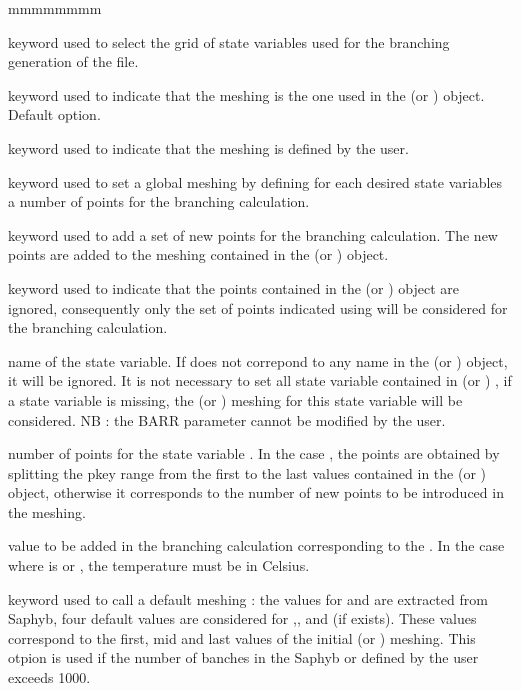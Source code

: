 \begin{ListeDeDescription}{mmmmmmmm}
\item[\moc{GRID}] keyword used to select the grid of state variables used for the branching generation of the  file.

\item[\moc{SAP}] keyword used to indicate that the meshing is the one used in the  (or )   object. Default option.

\item[\moc{USER}] keyword used to indicate that the meshing is defined by the user.

\item[\moc{GLOBAL}] keyword used to set a global meshing by defining for each desired  state variables a number of points for the branching calculation.

\item[\moc{ADD}] keyword used to add a set of new points for the branching calculation. The new points are added to the meshing contained in the  (or )   object.

\item[\moc{NEW}] keyword used to indicate that the points contained in the  (or )   object are ignored, consequently only the set of points indicated using  will be considered for the branching calculation.

\item[\dusa{pkey}] name of the state variable. If  does not correpond to any name in the  (or )   object, it will be ignored.  It is not necessary to set all state variable contained in  (or )  , if a state variable is missing, the  (or )   meshing for this state variable will be considered. NB : the BARR parameter cannot be modified by the user.

\item[\dusa{nval}] number of points for the state variable . In the case , the  points are obtained by splitting the pkey range from the first to the last values contained in the   (or )   object, otherwise it corresponds to the number of new points to be introduced in the meshing.

\item[\dusa{val}] value to be added in the branching calculation corresponding to the . In the case where  is  or , the temperature must be in Celsius.

\item[\moc{DEF}] keyword used to call a default meshing : the values for  and  are extracted from Saphyb, four default values are considered for ,,  and   (if exists). These values correspond to the first, mid and last values of the initial  (or )   meshing. This otpion is used if the number of banches in the Saphyb or defined by the user exceeds 1000.


\end{ListeDeDescription}
